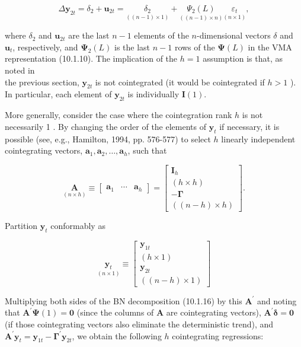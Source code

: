\documentclass[10pt]{article}
\begin{document}
\begin{equation*}
\Delta \mathbf{y}_{2 t}=\delta_{2}+\mathbf{u}_{2 t}=\underset{((n-1) \times 1)}{\delta_{2}}+\underset{((n-1) \times n)}{\Psi_{2}(L)} \underset{(n \times 1)}{\varepsilon_{t}}, \tag{10.2.5}
\end{equation*}


where $\delta_{2}$ and $\mathbf{u}_{2 t}$ are the last $n-1$ elements of the $n$-dimensional vectors $\delta$ and $\mathbf{u}_{t}$, respectively, and $\boldsymbol{\Psi}_{2}(L)$ is the last $n-1$ rows of the $\boldsymbol{\Psi}(L)$ in the VMA representation (10.1.10). The implication of the $h=1$ assumption is that, as noted in\\
the previous section, $\mathbf{y}_{2 t}$ is not cointegrated (it would be cointegrated if $h>1$ ). In particular, each element of $\mathbf{y}_{2 t}$ is individually $\mathbf{I}(1)$.

More generally, consider the case where the cointegration rank $h$ is not necessarily 1 . By changing the order of the elements of $\mathbf{y}_{t}$ if necessary, it is possible (see, e.g., Hamilton, 1994, pp. 576-577) to select $h$ linearly independent cointegrating vectors, $\mathbf{a}_{1}, \mathbf{a}_{2}, \ldots, \mathbf{a}_{h}$, such that

\[
\underset{(n \times h)}{\mathbf{A}} \equiv\left[\begin{array}{lll}
\mathbf{a}_{1} & \cdots & \mathbf{a}_{h}
\end{array}\right]=\left[\begin{array}{c}
\mathbf{I}_{h}  \tag{10.2.6}\\
(h \times h) \\
-\boldsymbol{\Gamma} \\
((n-h) \times h)
\end{array}\right] .
\]

Partition $\mathbf{y}_{t}$ conformably as

\[
\underset{(n \times 1)}{\mathbf{y}_{t}} \equiv\left[\begin{array}{c}
\mathbf{y}_{1 t}  \tag{10.2.7}\\
(h \times 1) \\
\mathbf{y}_{2 t} \\
((n-h) \times 1)
\end{array}\right]
\]

Multiplying both sides of the BN decomposition (10.1.16) by this $\mathbf{A}^{\prime}$ and noting that $\mathbf{A}^{\prime} \boldsymbol{\Psi}(1)=\mathbf{0}$ (since the columns of $\mathbf{A}$ are cointegrating vectors), $\mathbf{A}^{\prime} \boldsymbol{\delta}=\mathbf{0}$ (if those cointegrating vectors also eliminate the deterministic trend), and $\mathbf{A}^{\prime} \mathbf{y}_{t}= \mathbf{y}_{1 t}-\boldsymbol{\Gamma}^{\prime} \mathbf{y}_{2 t}$, we obtain the following $h$ cointegrating regressions:
\end{document}
